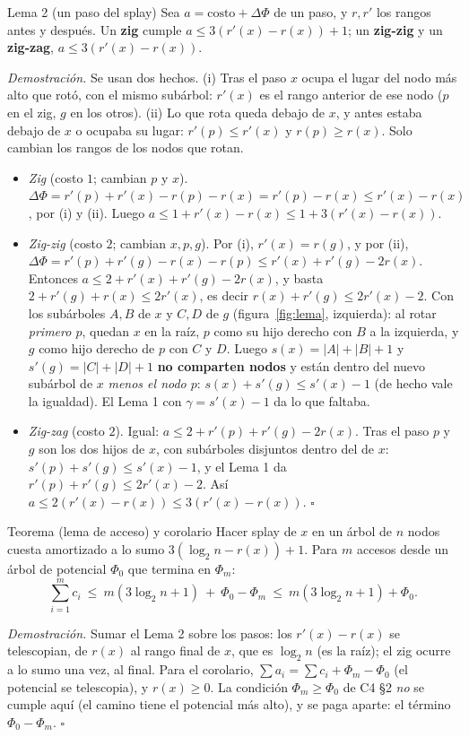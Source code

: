 \documentclass[11pt]{article}
\begin{document}
\begin{resultado}{Lema 2 (un paso del splay)}
Sea $a=\text{costo}+\Delta\Phi$ de un paso, y $r,r'$ los rangos antes y después. Un \textbf{zig} cumple
$a\le3(r'(x)-r(x))+1$; un \textbf{zig-zig} y un \textbf{zig-zag}, $a\le3(r'(x)-r(x))$.
\end{resultado}
\textit{Demostración.} Se usan dos hechos. (i) Tras el paso $x$ ocupa el lugar del nodo más alto que rotó, con el mismo
subárbol: $r'(x)$ es el rango anterior de ese nodo ($p$ en el zig, $g$ en los otros). (ii) Lo que rota queda debajo de $x$,
y antes estaba debajo de $x$ o ocupaba su lugar: $r'(p)\le r'(x)$ y $r(p)\ge r(x)$. Solo cambian los rangos de los nodos
que rotan.
\begin{itemize}[leftmargin=14pt,itemsep=2pt]
\item \emph{Zig} (costo $1$; cambian $p$ y $x$). $\Delta\Phi=r'(p)+r'(x)-r(p)-r(x)=r'(p)-r(x)\le r'(x)-r(x)$, por (i) y (ii).
Luego $a\le1+r'(x)-r(x)\le1+3(r'(x)-r(x))$.
\item \emph{Zig-zig} (costo $2$; cambian $x,p,g$). Por (i), $r'(x)=r(g)$, y por (ii),
$\Delta\Phi=r'(p)+r'(g)-r(x)-r(p)\le r'(x)+r'(g)-2r(x)$. Entonces $a\le2+r'(x)+r'(g)-2r(x)$, y basta
$2+r'(g)+r(x)\le2r'(x)$, es decir $r(x)+r'(g)\le2r'(x)-2$. Con los subárboles $A,B$ de $x$ y $C,D$ de $g$ (figura~\ref{fig:lema}, izquierda): al rotar
\emph{primero $p$}, quedan $x$ en la raíz, $p$ como su hijo derecho con $B$ a la izquierda, y $g$ como hijo derecho de $p$ con $C$ y $D$.
Luego $s(x)=|A|+|B|+1$ y $s'(g)=|C|+|D|+1$ \textbf{no comparten nodos} y están dentro del nuevo subárbol de $x$ \emph{menos el nodo $p$}:
$s(x)+s'(g)\le s'(x)-1$ (de hecho vale la igualdad). El Lema 1 con $\gamma=s'(x)-1$ da lo que faltaba.
\item \emph{Zig-zag} (costo $2$). Igual: $a\le2+r'(p)+r'(g)-2r(x)$. Tras el paso $p$ y $g$ son los dos hijos de $x$, con subárboles disjuntos
dentro del de $x$: $s'(p)+s'(g)\le s'(x)-1$, y el Lema 1 da $r'(p)+r'(g)\le2r'(x)-2$. Así $a\le2(r'(x)-r(x))\le3(r'(x)-r(x))$. $\square$
\end{itemize}

\begin{resultado}{Teorema (lema de acceso) y corolario}
Hacer splay de $x$ en un árbol de $n$ nodos cuesta amortizado a lo sumo $3(\log_2n-r(x))+1$. Para $m$ accesos desde un
árbol de potencial $\Phi_0$ que termina en $\Phi_m$:
\[
\sum_{i=1}^mc_i\ \le\ m(3\log_2 n+1)\ +\ \Phi_0-\Phi_m\ \le\ m(3\log_2n+1)+\Phi_0 .
\]
\end{resultado}
\textit{Demostración.} Sumar el Lema 2 sobre los pasos: los $r'(x)-r(x)$ se telescopian, de $r(x)$ al rango final de $x$, que es
$\log_2n$ (es la raíz); el zig ocurre a lo sumo una vez, al final. Para el corolario, $\sum a_i=\sum c_i+\Phi_m-\Phi_0$
(el potencial se telescopia), y $r(x)\ge0$. La condición $\Phi_m\ge\Phi_0$ de C4 §2 \emph{no} se cumple aquí
(el camino tiene el potencial más alto), y se paga aparte: el término $\Phi_0-\Phi_m$. $\square$
\end{document}
